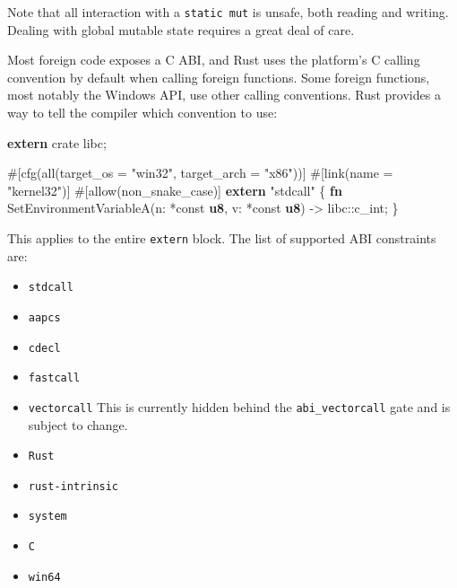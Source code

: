 \documentclass[a4paper,]{book}
\newenvironment{Shaded}{\begin{snugshade}}{\end{snugshade}}
\newcommand{\KeywordTok}[1]{\textcolor[rgb]{0.13,0.29,0.53}{\textbf{{#1}}}}
\newcommand{\StringTok}[1]{\textcolor[rgb]{0.31,0.60,0.02}{{#1}}}
\newcommand{\OtherTok}[1]{\textcolor[rgb]{0.56,0.35,0.01}{{#1}}}
\newcommand{\NormalTok}[1]{{#1}}
\begin{document}
Note that all interaction with a \texttt{static\ mut} is unsafe, both
reading and writing. Dealing with global mutable state requires a great
deal of care.


Most foreign code exposes a C ABI, and Rust uses the platform's C
calling convention by default when calling foreign functions. Some
foreign functions, most notably the Windows API, use other calling
conventions. Rust provides a way to tell the compiler which convention
to use:

\begin{Shaded}
\begin{Highlighting}[]
\KeywordTok{extern} \NormalTok{crate libc;}

\OtherTok{#[}\NormalTok{cfg}\OtherTok{(}\NormalTok{all}\OtherTok{(}\NormalTok{target_os }\OtherTok{=} \StringTok{"win32"}\OtherTok{,} \NormalTok{target_arch }\OtherTok{=} \StringTok{"x86"}\OtherTok{))]}
\OtherTok{#[}\NormalTok{link}\OtherTok{(}\NormalTok{name }\OtherTok{=} \StringTok{"kernel32"}\OtherTok{)]}
\OtherTok{#[}\NormalTok{allow}\OtherTok{(}\NormalTok{non_snake_case}\OtherTok{)]}
\KeywordTok{extern} \StringTok{"stdcall"} \NormalTok{\{}
    \KeywordTok{fn} \NormalTok{SetEnvironmentVariableA(n: *const }\KeywordTok{u8}\NormalTok{, v: *const }\KeywordTok{u8}\NormalTok{) -> libc::c_int;}
\NormalTok{\}}
\end{Highlighting}
\end{Shaded}

This applies to the entire \texttt{extern} block. The list of supported
ABI constraints are:

\begin{itemize}
\itemsep1pt\parskip0pt
\item
  \texttt{stdcall}
\item
  \texttt{aapcs}
\item
  \texttt{cdecl}
\item
  \texttt{fastcall}
\item
  \texttt{vectorcall} This is currently hidden behind the
  \texttt{abi\_vectorcall} gate and is subject to change.
\item
  \texttt{Rust}
\item
  \texttt{rust-intrinsic}
\item
  \texttt{system}
\item
  \texttt{C}
\item
  \texttt{win64}
\end{itemize}
\end{document}
